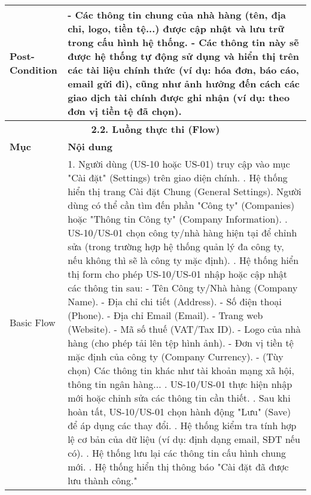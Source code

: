 \begin{longtable}{|m{4cm}|p{11cm}|}
\hline
Post-Condition & - Các thông tin chung của nhà hàng (tên, địa chỉ, logo, tiền tệ...) được cập nhật và lưu trữ trong cấu hình hệ thống. \newline - Các thông tin này sẽ được hệ thống tự động sử dụng và hiển thị trên các tài liệu chính thức (ví dụ: hóa đơn, báo cáo, email gửi đi), cũng như ảnh hưởng đến cách các giao dịch tài chính được ghi nhận (ví dụ: theo đơn vị tiền tệ đã chọn). \\
\hline
\multicolumn{2}{|c|}{\textbf{2.2. Luồng thực thi (Flow)}} \\
\hline
\textbf{Mục} & \textbf{Nội dung} \\
\hline
Basic Flow & 1. Người dùng (US-10 hoặc US-01) truy cập vào mục "Cài đặt" (Settings) trên giao diện chính. \newline 2. Hệ thống hiển thị trang Cài đặt Chung (General Settings). Người dùng có thể cần tìm đến phần "Công ty" (Companies) hoặc "Thông tin Công ty" (Company Information). \newline 3. US-10/US-01 chọn công ty/nhà hàng hiện tại để chỉnh sửa (trong trường hợp hệ thống quản lý đa công ty, nếu không thì sẽ là công ty mặc định). \newline 4. Hệ thống hiển thị form cho phép US-10/US-01 nhập hoặc cập nhật các thông tin sau: \newline    - Tên Công ty/Nhà hàng (Company Name). \newline    - Địa chỉ chi tiết (Address). \newline    - Số điện thoại (Phone). \newline    - Địa chỉ Email (Email). \newline    - Trang web (Website). \newline    - Mã số thuế (VAT/Tax ID). \newline    - Logo của nhà hàng (cho phép tải lên tệp hình ảnh). \newline    - Đơn vị tiền tệ mặc định của công ty (Company Currency). \newline    - (Tùy chọn) Các thông tin khác như tài khoản mạng xã hội, thông tin ngân hàng... \newline 5. US-10/US-01 thực hiện nhập mới hoặc chỉnh sửa các thông tin cần thiết. \newline 6. Sau khi hoàn tất, US-10/US-01 chọn hành động "Lưu" (Save) để áp dụng các thay đổi. \newline 7. Hệ thống kiểm tra tính hợp lệ cơ bản của dữ liệu (ví dụ: định dạng email, SĐT nếu có). \newline 8. Hệ thống lưu lại các thông tin cấu hình chung mới. \newline 9. Hệ thống hiển thị thông báo "Cài đặt đã được lưu thành công." \\

\end{longtable}
